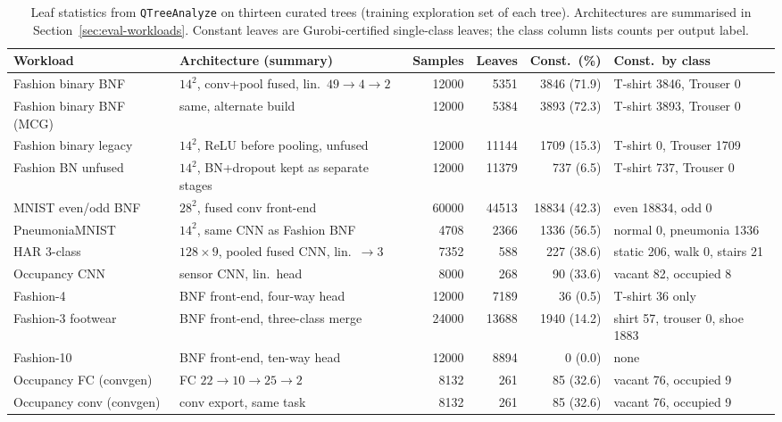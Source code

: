 \begin{table}[H]
	\centering
	\small
	\caption{Leaf statistics from \texttt{QTreeAnalyze} on thirteen curated trees (training exploration set of each tree).
		Architectures are summarised in Section~\ref{sec:eval-workloads}.
		Constant leaves are Gurobi-certified single-class leaves; the class column lists counts per output label.}
	\label{tab:impl-tree-survey}
	\begin{tabularx}{\textwidth}{@{}>{\raggedright\arraybackslash}p{}>{\raggedright\arraybackslash}p{}rrr>{\raggedright\arraybackslash}p{}@{}}
		\toprule
		\textbf{Workload} & \textbf{Architecture (summary)} & \textbf{Samples} & \textbf{Leaves} & \textbf{Const.\ (\%)} & \textbf{Const.\ by class} \\
		\midrule
		Fashion binary BNF & $14^2$, conv+pool fused, lin.\ $49{\rightarrow}4{\rightarrow}2$ & 12000 & 5351 & 3846 (71.9) & T-shirt 3846, Trouser 0 \\
		Fashion binary BNF (MCG) & same, alternate build & 12000 & 5384 & 3893 (72.3) & T-shirt 3893, Trouser 0 \\
		Fashion binary legacy & $14^2$, \ac{ReLU} before pooling, unfused & 12000 & 11144 & 1709 (15.3) & T-shirt 0, Trouser 1709 \\
		Fashion BN unfused & $14^2$, BN+dropout kept as separate stages & 12000 & 11379 & 737 (6.5) & T-shirt 737, Trouser 0 \\
		MNIST even/odd BNF & $28^2$, fused conv front-end & 60000 & 44513 & 18834 (42.3) & even 18834, odd 0 \\
		PneumoniaMNIST & $14^2$, same CNN as Fashion BNF & 4708 & 2366 & 1336 (56.5) & normal 0, pneumonia 1336 \\
		HAR 3-class & $128{\times}9$, pooled fused CNN, lin.\ $\rightarrow 3$ & 7352 & 588 & 227 (38.6) & static 206, walk 0, stairs 21 \\
		Occupancy CNN & sensor CNN, lin.\ head & 8000 & 268 & 90 (33.6) & vacant 82, occupied 8 \\
		Fashion-4 & BNF front-end, four-way head & 12000 & 7189 & 36 (0.5) & T-shirt 36 only \\
		Fashion-3 footwear & BNF front-end, three-class merge & 24000 & 13688 & 1940 (14.2) & shirt 57, trouser 0, shoe 1883 \\
		Fashion-10 & BNF front-end, ten-way head & 12000 & 8894 & 0 (0.0) & none \\
		Occupancy FC (convgen) & FC $22{\rightarrow}10{\rightarrow}25{\rightarrow}2$ & 8132 & 261 & 85 (32.6) & vacant 76, occupied 9 \\
		Occupancy conv (convgen) & conv export, same task & 8132 & 261 & 85 (32.6) & vacant 76, occupied 9 \\
		\bottomrule
	\end{tabularx}
\end{table}


